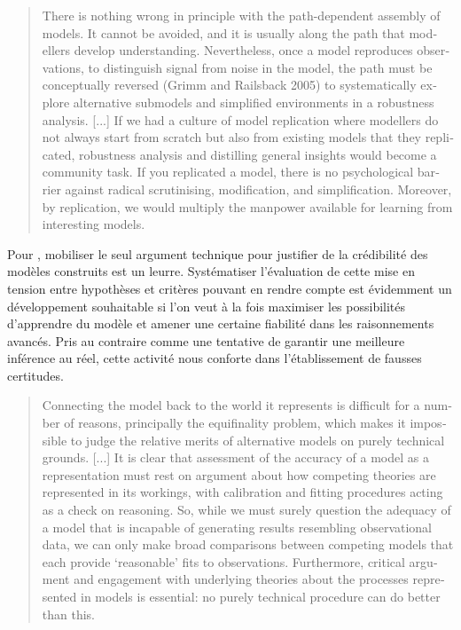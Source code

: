 \foreignblockquote{english}[\cite{Thiele2015}]{There is nothing wrong in principle with the path-dependent assembly of models. It cannot be avoided, and it is usually along the path that modellers develop understanding. Nevertheless, once a model reproduces observations, to distinguish signal from noise in the model, the path must be conceptually reversed (Grimm and Railsback 2005) to systematically explore alternative submodels and simplified environments in a robustness analysis. [...] If we had a culture of model replication where modellers do not always start from scratch but also from existing models that they replicated, robustness analysis and distilling general insights would become a community task. If you replicated a model, there is no psychological barrier against radical scrutinising, modification, and simplification. Moreover, by replication, we would multiply the manpower available for learning from interesting models.}

Pour \textcite{OSullivan2004}, mobiliser le seul argument technique pour justifier de la crédibilité des modèles construits est un leurre. Systématiser l'évaluation de cette mise en tension entre hypothèses et critères pouvant en rendre compte est évidemment un développement souhaitable si l'on veut à la fois maximiser les possibilités d'apprendre du modèle et amener une certaine fiabilité dans les raisonnements avancés. Pris au contraire comme une tentative de garantir une meilleure inférence au réel, cette activité nous conforte dans l'établissement de fausses certitudes.

\foreignblockquote{english}[\cite{OSullivan2004}]{Connecting the model back to the world it represents is difficult for a number of reasons, principally the equifinality problem, which makes it impossible to judge the relative merits of alternative models on purely technical grounds. [...] It is clear that assessment of the accuracy of a model as a representation must rest on argument about how competing theories are represented in its workings, with calibration and fitting procedures acting as a check on reasoning. So, while we must surely question the adequacy of a model that is incapable of generating results resembling observational data, we can only make broad comparisons between competing models that each provide ‘reasonable’ fits to observations. Furthermore, critical argument and engagement with underlying theories about the processes represented in models is essential: no purely technical procedure can do better than this.}

